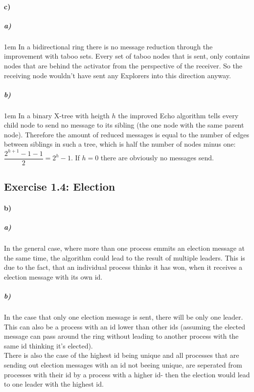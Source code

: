 \documentclass[12pt,a4paper]{article}
\begin{document}
\paragraph{c)}

\subparagraph{a)}
\begingroup
\leftskip1em
In a bidirectional ring there is no message reduction through the improvement with taboo sets. Every set of taboo nodes that is sent, only contains nodes that are behind the activator from the perspective of the receiver. So the receiving node wouldn't have sent any Explorers into this direction anyway.
\par
\endgroup
\subparagraph{b)}

\begingroup
\leftskip1em
In a binary X-tree with heigth $h$ the improved Echo algorithm tells every child node to send no message to its sibling (the one node with the same parent node). Therefore the amount of reduced messages is equal to the number of edges between siblings in such a tree, which is half the number of nodes minus one: $\dfrac{2^{h+1}-1-1}{2}=2^{h}-1$. If $h=0$ there are obviously no messages send.
\par
\endgroup

\subsection*{Exercise 1.4: Election}
\paragraph{b)} %
	\subparagraph{a)} %
	In the general case, where more than one process emmits an election message at the same time, the algorithm could lead to the result of multiple leaders. This is due to the fact, that an individual process thinks it has won, when it receives a election message with its own id.
	\subparagraph{b)} %
	In the case that only one election message is sent, there will be only one leader. This can also be a process with an id lower than other ids (assuming the elected message can pass around the ring without leading to another process with the same id thinking it's elected).\\
	There is also the case of the highest id being unique and all processes that are sending out election messages with an id not beeing unique, are seperated from processes with their id by a process with a higher id- then the election would lead to one leader with the highest id.
\end{document}
